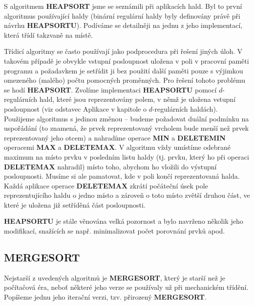 \documentclass[a4paper,12pt]{article}
\begin{document}
S algoritmem {\bf HEAPSORT} jsme se seznámili při 
aplikacích hald.  Byl to první algoritmus používající haldy 
(binární regulár\-ní haldy byly definovány právě při návrhu 
{\bf HEAP\-SORTU}).  Podíváme se detailněji na jednu z jeho 
implementací, která třídí takzvaně na místě. 

Třídicí algoritmy se často používají jako 
podprocedura při řešení jiných úloh. V takovém případě je 
obvykle vstupní posloupnost uložena v poli v pracovní 
paměti programu a poža\-dav\-kem  je setřídit ji 
bez použití další 
paměti pouze s výjimkou omezeného (malého) počtu pomocných 
proměnných. Pro řešení tohoto problému se hodí 
{\bf HEAPSORT}. Zvolíme implementaci {\bf HEAPSORTU} pomocí 
$d$-regulárních hald, které jsou reprezentovány  
polem, v němž je uložena vstupní posloupnost (viz odstavec 
Aplikace v kapitole o $d$-regulárních haldách). Použijeme 
algoritmus s jedinou změnou -- budeme požadovat duální 
podmínku na uspořádání (to znamená, že prvek reprezentovaný 
vrcholem bude menší než prvek reprezentovaný jeho 
otcem) a nahradíme operace {\bf MIN} a {\bf DELETEMIN }
operacemi {\bf MAX} a {\bf DELETEMAX}. V algoritmu vždy umístíme 
odebrané maximum na místo prvku v posled\-ním listu 
haldy (tj. prvku, který ho při operaci {\bf DELETEMAX }
nahradil) místo toho, abychom ho vložili 
do výstupní posloupnosti. Musíme si ale 
pamatovat, kde v poli končí reprezentovaná halda. Každá 
aplikace operace {\bf DELETEMAX} zkrátí počáteční úsek pole 
reprezentujícího haldu o jedno místo 
a zároveň o toto místo zvětší druhou část, ve které je uložena již 
setříděná část posloupnosti. 

{\bf HEAPSORTU} je stále věnována velká pozornost a 
bylo navrže\-no několik jeho modifikací, snažících se 
např. minimalizovat počet porovnání prvků apod.

\subsection{
MERGESORT
}

Nejstarší z uvedených algoritmů je 
{\bf MERGESORT}, který je starší než je počítačová éra, 
neboť některé jeho 
verze se používaly už při mecha\-nickém třídění. Popíšeme 
jednu jeho iterační verzi, tzv. přirozený {\bf MERGESORT}. 
\end{document}
